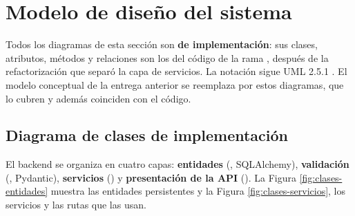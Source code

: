 \section{Modelo de diseño del sistema}

Todos los diagramas de esta sección son \textbf{de implementación}: sus clases, atributos, métodos y relaciones son los del código de la rama , después de la refactorización que separó la capa de servicios. La notación sigue UML 2.5.1 \parencite{omg2017}. El modelo conceptual de la entrega anterior se reemplaza por estos diagramas, que lo cubren y además coinciden con el código.


\subsection{Diagrama de clases de implementación}\label{sec:clases-impl}

El backend se organiza en cuatro capas: \textbf{entidades} (, SQLAlchemy), \textbf{validación} (, Pydantic), \textbf{servicios} () y \textbf{presentación de la API} (). La Figura \ref{fig:clases-entidades} muestra las entidades persistentes y la Figura \ref{fig:clases-servicios}, los servicios y las rutas que las usan.

